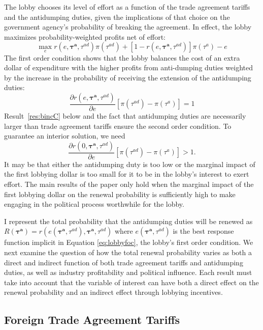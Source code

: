 \documentclass[10pt]{article}
\newcommand{\bta}{\bm{\tau^a}}
\newcommand{\tad}{\tau^{ad}}
\begin{document}
The lobby chooses its level of effort as a function of the trade agreement tariffs and the antidumping duties, given the implications of that choice on the government agency's probability of breaking the agreement. In effect, the lobby maximizes probability-weighted profits net of effort:
\[
  \max_{e} r(e,\bta,\tad) \pi(\tau^{ad}) + [1 - r(e,\bta,\tad)] \pi(\tau^a) - e
\]
The first order condition shows that the lobby balances the cost of an extra dollar of expenditure with the higher profits from anti-dumping duties weighted by the increase in the probability of receiving the extension of the antidumping duties:
\begin{equation}
	\frac{\partial r(e,\bta,\tad)}{\partial e} \left[ \pi(\tau^{ad})  - \pi(\tau^a) \right] = 1 
	\label{eq:lobbyfoc}
\end{equation}
Result~\ref{res:bincC} below and the fact that antidumping duties are necessarily larger than trade agreement tariffs ensure the second order condition. To guarantee an interior solution, we need
  \begin{equation}
	  \frac{\partial r(0,\bta,\tad)}{\partial e} \left[ \pi(\tau^{ad}) - \pi(\tau^a) \right] > 1.
		\label{ine:lobint}	
  \end{equation}
It may be that either the antidumping duty is too low or the marginal impact of the first lobbying dollar is too small for it to be in the lobby's interest to exert effort. The main results of the paper only hold when the marginal impact of the first lobbying dollar on the renewal probability is sufficiently high to make engaging in the political process worthwhile for the lobby.
  
I represent the total probability that the antidumping duties will be renewed as $R(\bta)=r(e(\bta,\tad),\bta,\tad)$ where $e(\bta,\tad)$ is the best response function implicit in Equation \ref{eq:lobbyfoc}, the lobby's first order condition. We next examine the question of how the total renewal probability varies as both a direct and indirect function of both trade agreement tariffs and antidumping duties, as well as industry profitability and political influence. Each result must take into account that the variable of interest can have both a direct effect on the renewal probability and an indirect effect through lobbying incentives.


\bigskip
\subsection{Foreign Trade Agreement Tariffs}
\label{sec:foreign}
\end{document}
